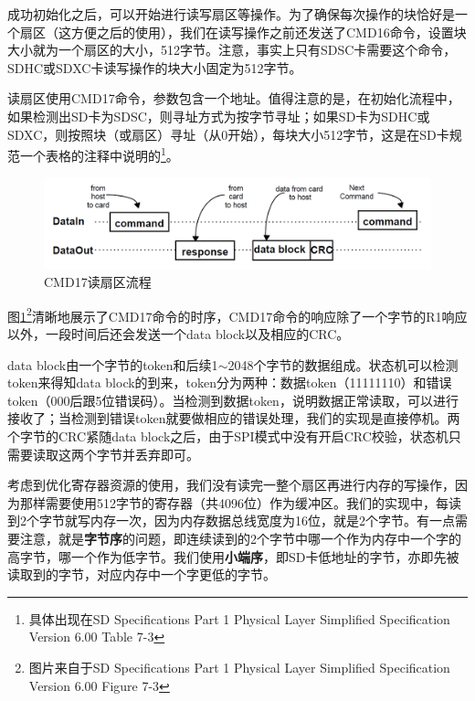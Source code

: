 \documentclass[11pt,utf8]{report}
\begin{document}
	\par 成功初始化之后，可以开始进行读写扇区等操作。为了确保每次操作的块恰好是一个扇区（这方便之后的使用），我们在读写操作之前还发送了CMD16命令，设置块大小就为一个扇区的大小，512字节。注意，事实上只有SDSC卡需要这个命令，SDHC或SDXC卡读写操作的块大小固定为512字节。
	
	\par 读扇区使用CMD17命令，参数包含一个地址。值得注意的是，在初始化流程中，如果检测出SD卡为SDSC，则寻址方式为按字节寻址；如果SD卡为SDHC或SDXC，则按照块（或扇区）寻址（从0开始），每块大小512字节，这是在SD卡规范一个表格的注释中说明的\footnote{具体出现在SD Specifications Part 1 Physical Layer Simplified Specification Version 6.00 Table 7-3}。 
	
	\begin{figure}[h!]
		\centering
		\includegraphics[width=\textwidth]{cmd17}
		\caption{CMD17读扇区流程}
		\label{cmd17}
	\end{figure}
	
	\par 图\ref{cmd17}\footnote{图片来自于SD Specifications Part 1 Physical Layer Simplified Specification Version 6.00 Figure 7-3}清晰地展示了CMD17命令的时序，CMD17命令的响应除了一个字节的R1响应以外，一段时间后还会发送一个data block以及相应的CRC。
	
	\par data block由一个字节的token和后续1$\sim$2048个字节的数据组成。状态机可以检测token来得知data block的到来，token分为两种：数据token（11111110）和错误token（000后跟5位错误码）。当检测到数据token，说明数据正常读取，可以进行接收了；当检测到错误token就要做相应的错误处理，我们的实现是直接停机。两个字节的CRC紧随data block之后，由于SPI模式中没有开启CRC校验，状态机只需要读取这两个字节并丢弃即可。
	
	\par 考虑到优化寄存器资源的使用，我们没有读完一整个扇区再进行内存的写操作，因为那样需要使用512字节的寄存器（共4096位）作为缓冲区。我们的实现中，每读到2个字节就写内存一次，因为内存数据总线宽度为16位，就是2个字节。有一点需要注意，就是\textbf{字节序}的问题，即连续读到的2个字节中哪一个作为内存中一个字的高字节，哪一个作为低字节。我们使用\textbf{小端序}，即SD卡低地址的字节，亦即先被读取到的字节，对应内存中一个字更低的字节。
	
\end{document}
